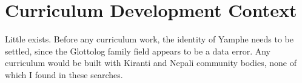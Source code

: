 \documentclass[12pt]{article}
\begin{document}
\section{Curriculum Development Context}
Little exists. Before any curriculum work, the identity of Yamphe needs to be settled, since the Glottolog family field appears to be a data error. Any curriculum would be built with Kiranti and Nepali community bodies, none of which I found in these searches.
\end{document}
